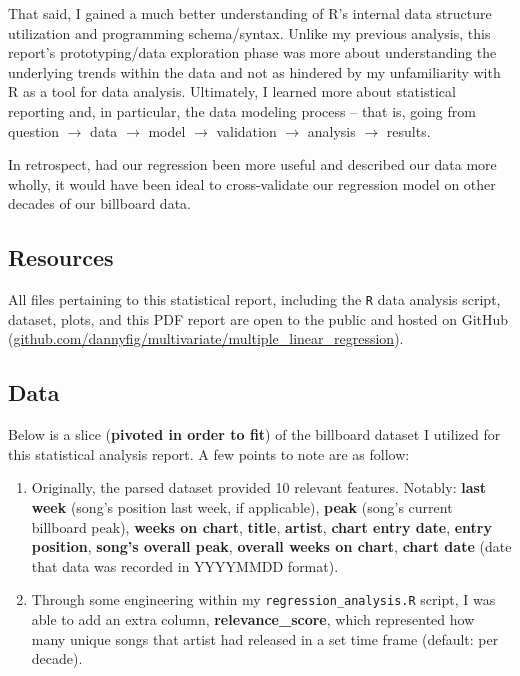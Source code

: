 \documentclass[11pt]{article} %
\begin{document}
That said, I gained a much better understanding of R's internal data structure utilization and programming schema/syntax. Unlike my previous analysis, this report's prototyping/data exploration phase was more about understanding the underlying trends within the data and not as hindered by my unfamiliarity with R as a tool for data analysis. Ultimately, I learned more about statistical reporting and, in particular, the data modeling process -- that is, going from question $\rightarrow$ data $\rightarrow$ model $\rightarrow$ validation $\rightarrow$ analysis $\rightarrow$ results.

In retrospect, had our regression been more useful and described our data more wholly, it would have been ideal to cross-validate our regression model on other decades of our billboard data.

\subsection*{Resources}
All files pertaining to this statistical report, including the \texttt{R} data analysis script, dataset, plots, and this PDF report are open to the public and hosted on GitHub (\href{https://github.com/dannyfig/MultivaRiate/tree/master/Multiple_Linear_Regression}{\url{github.com/dannyfig/multivariate/multiple_linear_regression}}).


\subsection*{Data}
Below is a slice (\textbf{pivoted in order to fit}) of the billboard dataset I utilized for this statistical analysis report. A few points to note are as follow:
\begin{enumerate}
	\item Originally, the parsed dataset provided 10 relevant features. Notably: \textbf{last week} (song's position last week, if applicable), \textbf{peak} (song's current billboard peak), \textbf{weeks on chart}, \textbf{title}, \textbf{artist}, \textbf{chart entry date}, \textbf{entry position}, \textbf{song's overall peak}, \textbf{overall weeks on chart}, \textbf{chart date} (date that data was recorded in YYYYMMDD format).
	\item Through some engineering within my \texttt{regression\_analysis.R} script, I was able to add an extra column, \textbf{relevance\_score}, which represented how many unique songs that artist had released in a set time frame (default: per decade).
\end{enumerate}
\end{document}

